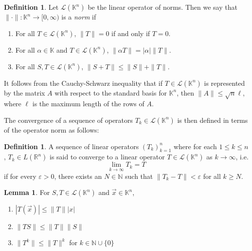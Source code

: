 \documentclass[11pt]{book}
\theoremstyle{definition}\newtheorem{definition}[subsection]{Definition}
\theoremstyle{definition}\newtheorem{example}[subsection]{Example}
\theoremstyle{definition}\newtheorem{notation}[subsection]{Notation}
\theoremstyle{definition}\newtheorem{remark}[subsection]{Remark}
\theoremstyle{theorem}\newtheorem{theorem}[subsection]{Theorem}
\theoremstyle{theorem}\newtheorem{lemma}[subsection]{Lemma}
\theoremstyle{theorem}\newtheorem{proposition}[subsection]{Proposition}
\theoremstyle{theorem}\newtheorem{corollary}[subsection]{Corollary}
\theoremstyle{theorem}\newtheorem{case}{Case}
\theoremstyle{remark}\newtheorem{subcase}{Subcase}[case]
\newcommand{\K}{\mathbb{K}}
\newcommand{\R}{\mathbb{R}}
\newcommand{\N}{\mathbb{N}}
\renewcommand{\L}{\mathscr{L}}
\newcommand{\e}{\varepsilon}
\begin{document}
\begin{definition}\label{definition:1.4.1}
    Let $\L(\K^n)$ be the linear operator of norms. Then we say that $\|\cdot\| : \K^n \to [0, \infty)$ is a \emph{norm} if 
    \begin{enumerate}
        \item For all $T \in \L(\K^n)$, $\|T\| = 0$ if and only if $T = 0$.
        \item For all $\alpha \in \K$ and $T \in \L(\K^n)$, $\|\alpha T\| = |\alpha|\|T\|$.
        \item For all $S, T \in \L(\K^n)$, $\|S + T\| \leq \|S\| + \|T\|$.
    \end{enumerate}
\end{definition}

It follows from the Cauchy-Schwarz inequality that if $T \in \L(\K^n)$ is represented by the matrix $A$ with respect to the standard basis for $\K^n$, then $\|A\| \leq \sqrt{n}\ell$, where $\ell$ is the maximum length of the rows of $A$.

The convergence of a sequence of operators $T_k \in \L(\K^n)$ is then defined in terms of the operator norm as follows:

\begin{definition}\label{definition:1.4.2}
    A sequence of linear operators $(T_k)_{k = 1}^{n}$ where for each $1 \leq k \leq n$, $T_k \in L(\R^n)$ is said to converge to a linear operator $T \in \L(\K^n)$ as $k \to \infty$, i.e.
    \begin{equation*}
        \lim_{k \to \infty} T_k = T
    \end{equation*}
    if for every $\e > 0$, there exists an $N \in \N$ such that $\|T_k - T\| < \e$ for all $k \geq N$.
\end{definition}

\begin{lemma}\label{lemma:1.4.3}
    For $S, T \in \L(\K^n)$ and $\vec{x} \in \K^n$,
    \begin{enumerate}
        \item $|T(\vec{x})| \leq \|T\||x|$
        \item $\|TS\| \leq \|T\| \|S\|$
        \item $\|T^k\| \leq \|T\|^k$ for $k \in \N \cup \{0\}$
    \end{enumerate}
\end{lemma}
\end{document}
